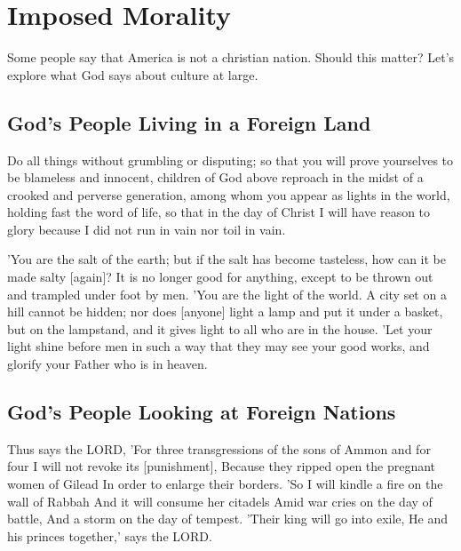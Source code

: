\chapter{Imposed Morality}

Some people say that America is not a christian nation. Should this matter? Let's explore what God says about culture at large. 
\section{God's People Living in a Foreign Land}

\begin{scripture}[Philippians 2:14-16]
    Do all things without grumbling or disputing;
    so that you will prove yourselves to be blameless and innocent, children of God above reproach in the midst of a crooked and perverse generation, among whom you appear as lights in the world,
    holding fast the word of life, so that in the day of Christ I will have reason to glory because I did not run in vain nor toil in vain.
\end{scripture}

\vspace{2\baselineskip}

\begin{scripture}[Matthew 5:13-16]
    'You are the salt of the earth; but if the salt has become tasteless, how can it be made salty [again]? It is no longer good for anything, except to be thrown out and trampled under foot by men.
    'You are the light of the world. A city set on a hill cannot be hidden;
    nor does [anyone] light a lamp and put it under a basket, but on the lampstand, and it gives light to all who are in the house.
    'Let your light shine before men in such a way that they may see your good works, and glorify your Father who is in heaven.
\end{scripture}

\vspace{2\baselineskip}

\section{God's People Looking at Foreign Nations}

\begin{scripture}[Amos 1:13-15]
    Thus says the LORD, 'For three transgressions of the sons of Ammon and for four I will not revoke its [punishment], Because they ripped open the pregnant women of Gilead In order to enlarge their borders.
    'So I will kindle a fire on the wall of Rabbah And it will consume her citadels Amid war cries on the day of battle, And a storm on the day of tempest.
    'Their king will go into exile, He and his princes together,' says the LORD.
\end{scripture}

